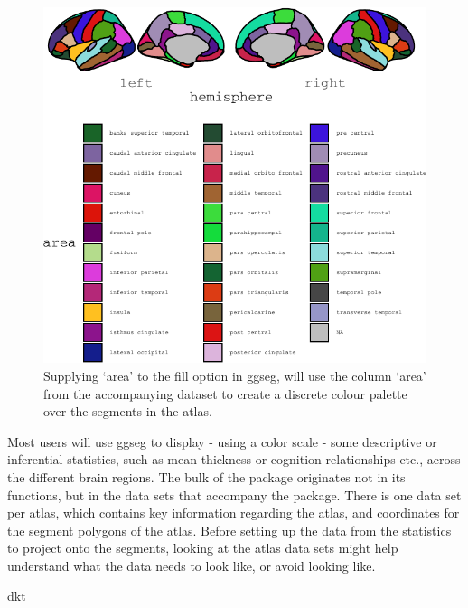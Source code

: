 \documentclass[fleqn,10pt]{wlpeerj} %
\newenvironment{Shaded}{\begin{snugshade}}{\end{snugshade}}
\newcommand{\NormalTok}[1]{#1}
\begin{document}
\begin{figure}
\centering
\includegraphics{draft_2_files/figure-latex/fill-1.pdf}
\caption{\label{fig:fill}Supplying `area' to the fill option in ggseg, will use the column `area' from the accompanying dataset to create a discrete colour palette over the segments in the atlas.}
\end{figure}

Most users will use ggseg to display - using a color scale - some descriptive or inferential statistics, such as mean thickness or cognition relationships etc., across the different brain regions.
The bulk of the package originates not in its functions, but in the data sets that accompany the package.
There is one data set per atlas, which contains key information regarding the atlas, and coordinates for the segment polygons of the atlas.
Before setting up the data from the statistics to project onto the segments, looking at the atlas data sets might help understand what the data needs to look like, or avoid looking like.

\small

\begin{Shaded}
\begin{Highlighting}[]
\NormalTok{dkt}
\end{Highlighting}
\end{Shaded}
\end{document}
